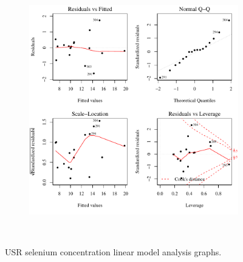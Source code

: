 \begin{linenumbers}
\begin{landscape}
\begin{figure}
\begin{subfigure}{0.7\textwidth}
			\includegraphics[width=\tableCustomSize]{"Figures/Results_USR/Stochastic/Conc Model lm-fit CAN"}
		\end{subfigure}\\
		\caption{USR selenium concentration linear model analysis graphs.}
	\end{figure}
\end{landscape}


\end{linenumbers}
